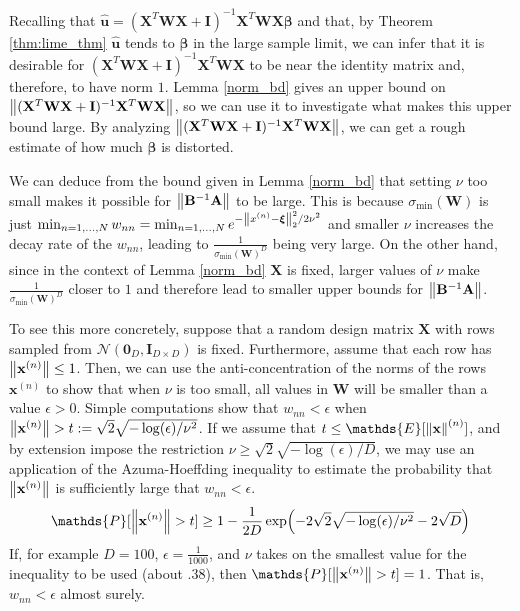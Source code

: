 \documentclass[mnsc,blindrev]{informs3}
\newcommand{\bx}{\mathbf{x}}
\newcommand{\bu}{\mathbf{u}}
\newcommand{\bA}{\mathbf{A}}
\newcommand{\bB}{\mathbf{B}}
\newcommand{\bX}{\mathbf{X}}
\newcommand{\bI}{\mathbf{I}}
\newcommand{\bW}{\mathbf{W}}
\newcommand{\bxi}{\boldsymbol{\xi}}
\begin{document}
                Recalling that $\hat{\bu}=(\bX^T \bW \bX+\bI)^{-1}\bX^T \bW \bX \boldsymbol{\beta}$ and that, by Theorem \ref{thm:lime_thm} $\hat{\bu}$ tends to $\boldsymbol{\beta}$ in the large sample limit, we can infer that it is desirable for $(\bX^T \bW \bX+\bI)^{-1}\bX^T \bW \bX$ to be near the identity matrix and, therefore, to have norm $1$. Lemma \ref{norm_bd} gives an upper bound on $\norm{(\bX^T \bW \bX+\bI)^{-1}\bX^T \bW \bX}$, so we can use it to investigate what makes this upper bound large. By analyzing $\norm{(\bX^T \bW \bX+\bI)^{-1}\bX^T \bW \bX}$, we can get a rough estimate of how much $\boldsymbol{\beta}$ is distorted. %
                
                We can deduce from the bound given in Lemma \ref{norm_bd} that setting $\nu$ too small makes it possible for $\norm{\bB^{-1}\bA}$ to be large. This is because $\sigma_{\min}(\bW)$ is just $\min_{n=1,\ldots,N} w_{nn}=\min_{n=1,\ldots,N} e^{-\norm{x^{(n)}-\bxi}_2^2/2\nu^2}$ and smaller $\nu$ increases the decay rate of the $w_{nn}$, leading to $\frac{1}{\sigma_{\min}(\bW)^D}$ being very large. On the other hand, since in the context of Lemma \ref{norm_bd} $\bX$ is fixed, larger values of $\nu$ make $\frac{1}{\sigma_{\min}(\bW)^D}$ closer to $1$ and therefore lead to smaller upper bounds for $\norm{\bB^{-1}\bA}$.

                To see this more concretely, suppose that a random design matrix $\bX$ with rows sampled from $\mathcal{N}(\mathbf{0}_{D}, \bI_{D\times D})$ is fixed. Furthermore, assume that each row has $\norm{\bx^{(n)}} \leq 1$. Then, we can use the anti-concentration of the norms of the rows $\bx^{(n)}$ to show that when $\nu$ is too small, all values in $\bW$ will be smaller than a value $\epsilon > 0$. Simple computations show that $w_{nn} < \epsilon$ when $\norm{\bx^{(n)}} > t:= \sqrt{2}\sqrt{-\log(\epsilon)/\nu^2}$. If we assume that $t\leq \mathds{E}[\norm{\bx}^{(n)}]$, and by extension impose the restriction $\nu \geq \sqrt{2}\sqrt{-\log(\epsilon)/D}$, we may use an application of the Azuma-Hoeffding inequality \citep{hoeffding1994probability} to estimate the probability that $\norm{\bx^{(n)}}$ is sufficiently large that $w_{nn} < \epsilon$. 
                \begin{equation*}
                    \mathds{P}[\norm{\bx^{(n)}} > t] \geq 1 - \frac{1}{2D}\exp(-2\sqrt{2}\sqrt{-\log(\epsilon)/\nu^2}-2\sqrt{D})
                \end{equation*}
                If, for example $D=100$, $\epsilon=\frac{1}{1000}$, and $\nu$ takes on the smallest value for the inequality to be used (about $.38$), then $\mathds{P}[\norm{\bx^{(n)}} > t]=1$. That is, $w_{nn}<\epsilon$  almost surely.
\end{document}
